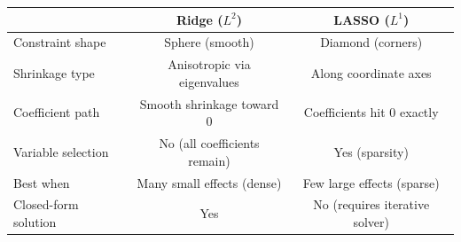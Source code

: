 \documentclass[11pt,a4paper]{article}
\theoremstyle{plain}
\theoremstyle{definition}
\begin{document}
\begin{center}
\begin{tabular}{lcc}
\toprule
& \textbf{Ridge ($L^2$)} & \textbf{LASSO ($L^1$)} \\
\midrule
Constraint shape & Sphere (smooth) & Diamond (corners) \\
Shrinkage type & Anisotropic via eigenvalues & Along coordinate axes \\
Coefficient path & Smooth shrinkage toward 0 & Coefficients hit 0 exactly \\
Variable selection & No (all coefficients remain) & Yes (sparsity) \\
Best when & Many small effects (dense) & Few large effects (sparse) \\
Closed-form solution & Yes & No (requires iterative solver) \\
\bottomrule
\end{tabular}
\end{center}

\end{document}
